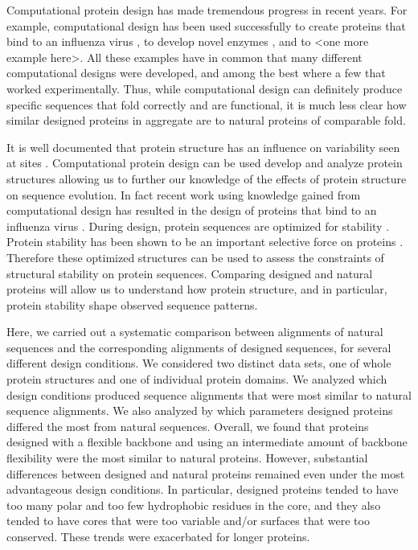 \documentclass[12pt]{article}
\begin{document}
Computational protein design has made tremendous progress in recent years. For example, computational design has been used successfully to create proteins that bind to an influenza virus \citep{Fleishman2011}, to develop novel enzymes \cite{Rothlisberger2008}, and to {\color{red}<one more example here>}. All these examples have in common that many different computational designs were developed, and among the best where a few that worked experimentally. Thus, while computational design can definitely produce specific sequences that fold correctly and are functional, it is much less clear how similar designed proteins in aggregate are to natural proteins of comparable fold.


{\color{blue}
It is well documented that protein structure has an influence on variability seen at sites \citep{Franzosa2009, Ramsey2011}. Computational protein design can be used develop and analyze protein structures allowing us to further our knowledge of the effects of protein structure on sequence evolution. In fact recent work using knowledge gained from computational design has resulted in the design of proteins that bind to an influenza virus \citep{Fleishman2011}. During design, protein sequences are optimized for stability \citep{Butterfoss2006, Das2008}. Protein stability has been shown to be an important selective force on proteins \citep{Drummond2008}. Therefore these optimized structures can be used to assess the constraints of structural stability on protein sequences. Comparing designed and natural proteins will allow us to understand how protein structure, and in particular, protein stability shape observed sequence patterns.
}


Here, we carried out a systematic comparison between alignments of natural sequences and the corresponding alignments of designed sequences, for several different design conditions. We considered two distinct data sets, one of whole protein structures and one of individual protein domains. We analyzed which design conditions produced sequence alignments that were most similar to natural sequence alignments. We also analyzed by which parameters designed proteins differed the most from natural sequences. Overall, we found that proteins designed with a flexible backbone and using an intermediate amount of backbone flexibility were the most similar to natural proteins. However, substantial differences between designed and natural proteins remained even under the most advantageous design conditions. In particular, designed proteins tended to have too many polar and too few hydrophobic residues in the core, and they also tended to have cores that were too variable and/or surfaces that were too conserved. These trends were exacerbated for longer proteins.
\end{document}
